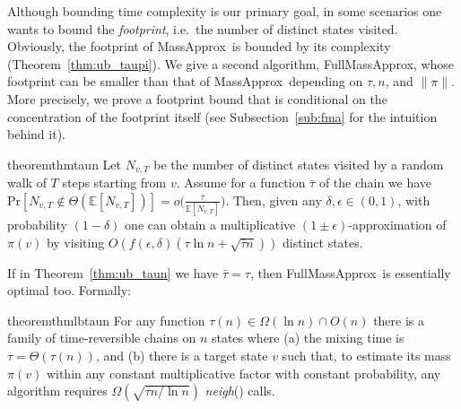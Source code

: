 \documentclass[a4paper,11pt]{article}
\newcommand{\neigh}[1]{\emph{neigh}(#1)}
\newcommand{\E}{\mathbb{E}}
\newcommand{\prob}{\text{Pr}}
\newcommand{\taupiest}{MassApprox}
\newcommand{\taunest}{FullMassApprox}
\begin{document}
Although bounding time complexity is our primary goal, in some scenarios one wants to bound the \textit{footprint}, i.e.\ the number of distinct states visited.
Obviously, the footprint of \taupiest\ is bounded by its complexity (Theorem~\ref{thm:ub_taupi}).
We give a second algorithm, \taunest, whose footprint can be smaller than that of \taupiest\ depending on $\tau, n$, and $\|\pi\|$.
More precisely, we prove a footprint bound that is conditional on the concentration of the footprint itself (see Subsection~\ref{sub:fma} for the intuition behind it).
\begin{restatable}{theorem}{thmtaun}
\label{thm:ub_taun}
Let $N_{v,T}$ be the number of distinct states visited by a random walk of $T$ steps starting from $v$.
Assume for a function $\bar{\tau}$ of the chain we have $\prob[ N_{v,T} \notin \Theta(\E[N_{v,T}])] = o\big(\frac{\bar{\tau}}{\E[N_{v,T}]})$.
Then, given any $\delta,\epsilon \in (0,1)$, with probability $(1-\delta)$ one can obtain a multiplicative $(1\pm\epsilon)$-approximation of $\pi(v)$ by visiting $O(f(\epsilon,\delta)(\tau \ln n + \sqrt{\bar{\tau} n}))$ distinct states.
\end{restatable}

\noindent If in Theorem~\ref{thm:ub_taun} we have $\bar{\tau} = \tau$, then \taunest\ is essentially optimal too. Formally:
\begin{restatable}{theorem}{thmlbtaun}
\label{thm:lb_taun}
For any function $\tau(n) \in \Omega(\ln{n}) \cap O(n)$ there is a family of time-reversible chains on $n$ states where (a) the mixing time is $\tau=\Theta(\tau(n))$, and (b) there is a target state $v$ such that, to estimate its mass $\pi(v)$ within any constant multiplicative factor with constant probability, any algorithm requires $\Omega(\sqrt{\tau n/\ln{n}})$ \neigh{} calls.
\end{restatable}
\end{document}
